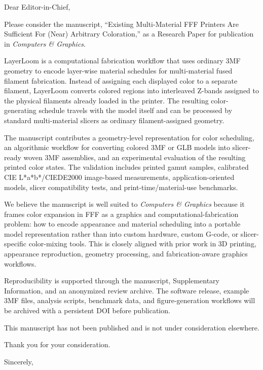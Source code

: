 \documentclass[11pt]{letter}
\date{June 1, 2026}
\begin{document}
\begin{letter}{Dear Editor-in-Chief,}

\opening{}

Please consider the manuscript, ``Existing Multi-Material FFF Printers Are Sufficient For (Near) Arbitrary Coloration,'' as a Research Paper for publication in \textit{Computers \& Graphics}.

LayerLoom is a computational fabrication workflow that uses ordinary 3MF geometry to encode layer-wise material schedules for multi-material fused filament fabrication. Instead of assigning each displayed color to a separate filament, LayerLoom converts colored regions into interleaved Z-bands assigned to the physical filaments already loaded in the printer. The resulting color-generating schedule travels with the model itself and can be processed by standard multi-material slicers as ordinary filament-assigned geometry.

The manuscript contributes a geometry-level representation for color scheduling, an algorithmic workflow for converting colored 3MF or GLB models into slicer-ready woven 3MF assemblies, and an experimental evaluation of the resulting printed color states. The validation includes printed gamut samples, calibrated CIE L*a*b*/CIEDE2000 image-based measurements, application-oriented models, slicer compatibility tests, and print-time/material-use benchmarks.

We believe the manuscript is well suited to \textit{Computers \& Graphics} because it frames color expansion in FFF as a graphics and computational-fabrication problem: how to encode appearance and material scheduling into a portable model representation rather than into custom hardware, custom G-code, or slicer-specific color-mixing tools. This is closely aligned with prior work in 3D printing, appearance reproduction, geometry processing, and fabrication-aware graphics workflows.

Reproducibility is supported through the manuscript, Supplementary Information, and an anonymized review archive. The software release, example 3MF files, analysis scripts, benchmark data, and figure-generation workflows will be archived with a persistent DOI before publication.

This manuscript has not been published and is not under consideration elsewhere.

Thank you for your consideration.

\closing{Sincerely,}

\end{letter}
\end{document}
